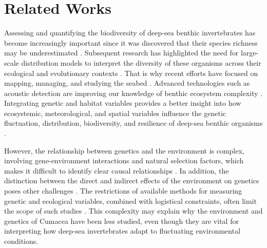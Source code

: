\section{Related Works}\label{related-works}
Assessing and quantifying the biodiversity of deep-sea benthic invertebrates has become increasingly important since it was discovered that their species richness may be underestimated \citep{grassle1992deep}. Subsequent research has highlighted the need for large-scale distribution models to interpret the diversity of these organisms across their ecological and evolutionary contexts \citep{rex1997large}. That is why recent efforts have focused on mapping, managing, and studying the seabed \citep{brown2011benthic}. Advanced technologies such as acoustic detection are improving our knowledge of benthic ecosystem complexity \citep{brown2011benthic}. Integrating genetic and habitat variables provides a better insight into how ecosystemic, meteorological, and spatial variables influence the genetic fluctuation, distribution, biodiversity, and resilience of deep-sea benthic organisms \citep{vrijenhoek2009cryptic}.

However, the relationship between genetics and the environment is complex, involving gene-environment interactions and natural selection factors, which makes it difficult to identify clear causal relationships \citep{balkenhol_identifying_2009}. In addition, the distinction between the direct and indirect effects of the environment on genetics poses other challenges \citep{manel_perspectives_2010, balkenhol_landscape_2019}. The restrictions of available methods for measuring genetic and ecological variables, combined with logistical constraints, often limit the scope of such studies \citep{manel_perspectives_2010, shafer_widespread_2013}. This complexity may explain why the environment and genetics of Cumacea have been less studied, even though they are vital for interpreting how deep-sea invertebrates adapt to fluctuating environmental conditions.


